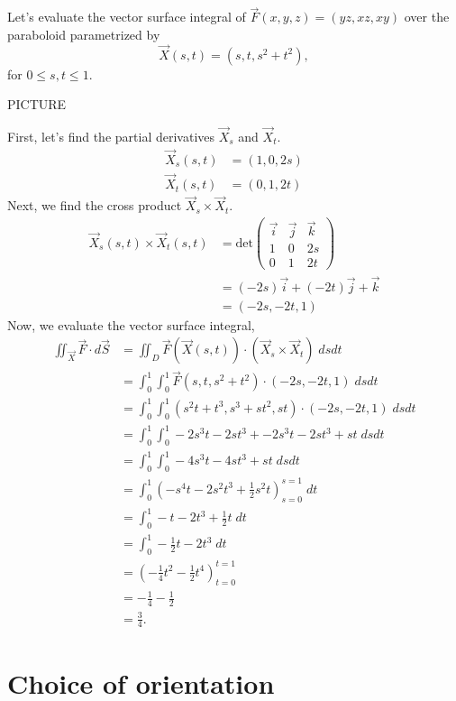 \documentclass{ximera}
\begin{document}
\begin{example}
Let's evaluate the vector surface integral of $\vec{F}(x,y,z) = (yz, xz, xy)$ over the paraboloid parametrized by
\[
\vec{X}(s,t) = (s, t, s^2+t^2),
\]
for $0\leq s,t\leq 1$.

PICTURE

First, let's find the partial derivatives $\vec{X}_s$ and $\vec{X}_t$.
\begin{align*}
\vec{X}_s(s,t) &= (1,0,2s)\\
\vec{X}_t(s,t) &= (0,1,2t)
\end{align*}
Next, we find the cross product $\vec{X}_s\times\vec{X}_t$.
\begin{align*}
\vec{X}_s(s,t)\times\vec{X}_t(s,t) &= \text{det}\begin{pmatrix}
\vec{i} & \vec{j} & \vec{k}\\
1 & 0 & 2s\\
0 & 1 & 2t
\end{pmatrix}\\
&= (-2s)\vec{i} + (-2t)\vec{j} + \vec{k}\\
&= (-2s,-2t,1)
\end{align*}
Now, we evaluate the vector surface integral,
\begin{align*}
\iint_{\vec{X}}\vec{F}\cdot d\vec{S} &= \iint_D \vec{F}(\vec{X}(s,t))\cdot (\vec{X}_s\times\vec{X}_t)\;dsdt\\
&= \int_0^1\int_0^1\vec{F}(s, t, s^2+t^2)\cdot (-2s,-2t,1)\;dsdt\\
&= \int_0^1\int_0^1 (s^2t+t^3, s^3+st^2, st)\cdot (-2s,-2t,1)\;dsdt\\
&= \int_0^1\int_0^1 -2s^3t-2st^3 + -2s^3t -2st^3 + st\;dsdt\\
&= \int_0^1\int_0^1 -4s^3t-4st^3 + st\;dsdt\\
&= \int_0^1 \left(-s^4t - 2s^2t^3 + \frac{1}{2}s^2 t\right)_{s = 0}^{s = 1}\;dt\\
&= \int_0^1 -t - 2t^3 + \frac{1}{2}t\;dt\\
&= \int_0^1 -\frac{1}{2}t - 2t^3\;dt\\
&= \left(-\frac{1}{4}t^2 - \frac{1}{2}t^4\right)_{t=0}^{t=1}\\
&= -\frac{1}{4} - \frac{1}{2}\\
&= \frac{3}{4}.
\end{align*}
\end{example}

\section*{Choice of orientation}
\end{document}
